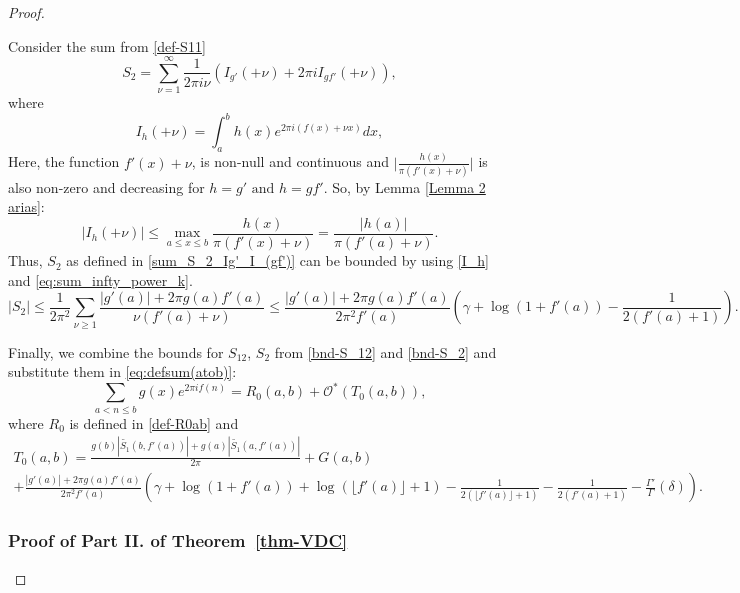 \documentclass[11pt,letterpaper,oneside,reqno]{amsart}
\renewcommand{\^}[1]{\widehat{#1}}
\numberwithin{equation}{section}
\theoremstyle{remark}
\newcommand*{\thmref}[1]{Theorem~\ref{#1}}
\begin{document}
\begin{proof}
\begin{itemize}
Consider the sum from \eqref{def-S11}\begin{equation} \label{sum_S_2_Ig'_I_(gf')}
    S_2=\sum_{\nu=1}^{\infty}\frac{1}{2\pi i \nu}\left(I_{g'}(+\nu)+2\pi i I_{gf'}(+\nu)\right) ,
    \end{equation}
where
\begin{equation}
    I_h(+\nu)=\int_a^bh(x)e^{2\pi i (f(x)+\nu x)}dx,
\end{equation}
    Here, the function $f'(x)+\nu $, is non-null and continuous and $\bigg| \frac{h(x)}{\pi (f'(x)+\nu )}\bigg| $ is also non-zero and decreasing for $h= g' \text{ and } h =gf'$. So, by Lemma \ref{Lemma 2 arias}:
    \begin{equation} \label{I_h}
    |I_h(+\nu)|\le\max_{a\leq x \leq b}\frac{h(x)}{\pi(f'(x)+\nu )}=\frac{|h(a)|}{\pi(f'(a)+\nu )}.
    \end{equation}
    Thus, $S_2$ as defined in \eqref{sum_S_2_Ig'_I_(gf')} can be bounded by using \eqref{I_h} and \eqref{eq:sum_infty_power_k}.
 \begin{equation}
     |S_2|  \le\frac{1}{2\pi^2}\sum_{\nu \ge1}\frac{|g'(a)|+2\pi g(a)f'(a)}{\nu (f'(a)+\nu)}\leq \frac{|g'(a)|+2\pi g(a)f'(a)}{2\pi^2 f'(a)}\left(\gamma+\log(1+f'(a))-\frac{1}{2(f'(a)+1)}\right).
    \label{bnd-S_2}
\end{equation}
\end{itemize}
%
Finally, we combine the bounds for $S_{12}$, $S_2$ from \eqref{bnd-S_12} and \eqref{bnd-S_2} and substitute them in \eqref{eq:defsum(atob)}:
\begin{equation}\label{final-R0T0part1}
\sum_{a<n \leq b} g(x)e^{2\pi i f(n)} =
      R_0(a,b) + \mathcal{O}^*\left(T_0(a,b)\right),
    \end{equation}
    where $R_0$ is defined in \eqref{def-R0ab} and 
\begin{multline}\label{def-T0ab}
        T_0(a,b) 
  =  \frac{g(b) |\tilde{S_1}(b,f'(a))| + g(a) |\tilde{S_1}(a,f'(a))|}{2\pi}   + G(a,b)  
        \\  + \frac{|g'(a)|+2\pi g(a)f'(a)}{2\pi^2 f'(a)}\left(\gamma+ \log(1+f'(a))+\log(\lfloor f'(a) \rfloor+1)-\frac1{2(\lfloor f'(a) \rfloor+1)} -\frac{1}{2(f'(a)+1)}
- \frac{\Gamma'}{\Gamma}(\delta)\right)  .
\end{multline}


\subsubsection{ Proof of Part II. of \thmref{thm-VDC}}



\end{proof}
\end{document}
